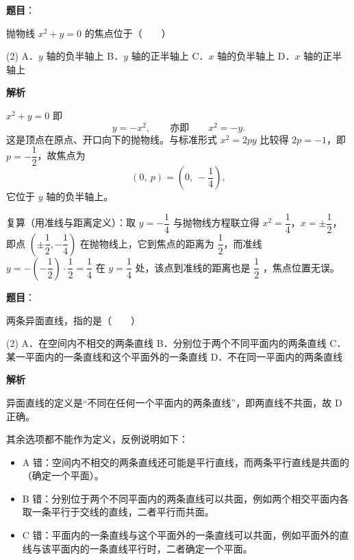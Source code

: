 \begin{answer}

\textbf{题目}：

抛物线 $x^2+y=0$ 的焦点位于\mbox{（　　）}

\begin{gkopts}(2)
\task A．$y$ 轴的负半轴上
\task B．$y$ 轴的正半轴上
\task C．$x$ 轴的负半轴上
\task D．$x$ 轴的正半轴上
\end{gkopts}

\textbf{解析}

$x^2+y=0$ 即
\nopagebreak[4]
\[
y=-x^2,\qquad\text{亦即}\qquad x^2=-y.
\]
这是顶点在原点、开口向下的抛物线。与标准形式 $x^2=2py$ 比较得 $2p=-1$，即 $p=-\dfrac12$，故焦点为
\nopagebreak[4]
\[
\left(0,\ p\right)=\left(0,\ -\frac14\right),
\]
它位于 $y$ 轴的负半轴上。

复算（用准线与距离定义）：取 $y=-\dfrac14$ 与抛物线方程联立得 $x^2=\dfrac14$，$x=\pm\dfrac12$，即点 $\left(\pm\dfrac12,-\dfrac14\right)$ 在抛物线上，它到焦点的距离为 $\dfrac12$，而准线 $y=-\left(-\dfrac12\right)\cdot\dfrac12=\dfrac14$ 在 $y=\dfrac14$ 处，该点到准线的距离也是 $\dfrac12$ ，焦点位置无误。


\end{answer}
\begin{answer}

\textbf{题目}：

两条异面直线，指的是\mbox{（　　）}

\begin{gkopts}(2)
\task A．在空间内不相交的两条直线
\task B．分别位于两个不同平面内的两条直线
\task C．某一平面内的一条直线和这个平面外的一条直线
\task D．不在同一平面内的两条直线
\end{gkopts}

\textbf{解析}

异面直线的定义是“不同在任何一个平面内的两条直线”，即两直线不共面，故 D 正确。

其余选项都不能作为定义，反例说明如下：

\begin{itemize}
\item A 错：空间内不相交的两条直线还可能是平行直线，而两条平行直线是共面的（确定一个平面）。
\item B 错：分别位于两个不同平面内的两条直线可以共面，例如两个相交平面内各取一条平行于交线的直线，二者平行而共面。
\item C 错：平面内的一条直线与这个平面外的一条直线可以共面，例如平面外的直线与该平面内的一条直线平行时，二者确定一个平面。
\end{itemize}


\end{answer}
